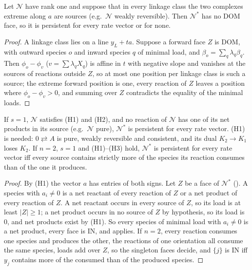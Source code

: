 \documentclass[11pt,a4paper]{report}
\newcommand{\Net}{\mathcal{N}}
\newcommand{\Nd}{\mathcal{N}^{*}}
\begin{document}
\begin{theorem}\label{thm:S1WR}
Let \(\Net\) have rank one and suppose that in every linkage class the two complexes extreme along \(a\) are sources
(e.g.\ \(\Net\) weakly reversible). Then \(\Nd\) has no DOM face, so it is persistent for every rate vector or for none.
\end{theorem}
\begin{proof}
A linkage class lies on a line \(y_L+ta\). Suppose a forward face \(Z\) is DOM, with outward species \(o\) and inward
species \(q\) of minimal load, and \(\beta_o=\sum_q\lambda_q\beta_q\). Then \(\phi_o-\phi_v\) (\(v=\sum\lambda_qX_q\)) is affine
in \(t\) with negative slope and vanishes at the sources of reactions outside \(Z\), so at most one position per linkage
class is such a source; the extreme forward position is one, every reaction of \(Z\) leaves a position where
\(\phi_o-\phi_v>0\), and summing over \(Z\) contradicts the equality of the minimal loads.
\end{proof}

\begin{corollary}\label{cor:Cpure}
If \(s=1\), \(\Net\) satisfies (H1) and (H2), and no reaction of \(\Net\) has one of its net products in its source (e.g.\
\(\Net\) pure), \(\Nd\) is persistent for every rate vector. (H1) is needed: \(0\rightleftarrows A\) is pure, weakly
reversible and consistent, and its dual \(K_2\to K_1\) loses \(K_2\). If \(n=2\), \(s=1\) and (H1)--(H3) hold, \(\Nd\) is persistent for every
rate vector iff every source contains strictly more of the species its reaction consumes than of the one it produces.
\end{corollary}
\begin{proof}
By (H1) the vector \(a\) has entries of both signs. Let \(Z\) be a face of \(\Nd\) (). A species with
\(a_i\neq0\) is a net reactant of every reaction of \(Z\) or a net product of every reaction of \(Z\). A net reactant
occurs in every source of \(Z\), so its load is at least \(|Z|\ge1\); a net product occurs in no source of \(Z\) by
hypothesis, so its load is \(0\), and net products exist by (H1). So every species of minimal load with \(a_i\neq0\) is a
net product, every face is IN, and \zcref{cor:S1N} applies. If \(n=2\), every reaction consumes one species and
produces the other, the reactions of one orientation all consume the same species, loads add over \(Z\), so the
singleton faces decide, and \(\{j\}\) is IN iff \(y_j\) contains more of the consumed than of the produced species.
\end{proof}
\end{document}
